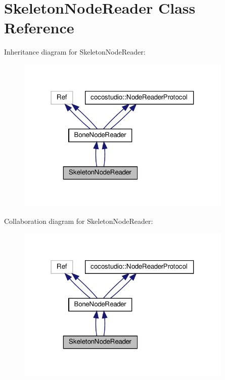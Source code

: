 \hypertarget{classSkeletonNodeReader}{}\section{Skeleton\+Node\+Reader Class Reference}
\label{classSkeletonNodeReader}


Inheritance diagram for Skeleton\+Node\+Reader\+:
\nopagebreak
\begin{figure}[H]
\begin{center}
\leavevmode
\includegraphics[width=292pt]{classSkeletonNodeReader__inherit__graph}
\end{center}
\end{figure}


Collaboration diagram for Skeleton\+Node\+Reader\+:
\nopagebreak
\begin{figure}[H]
\begin{center}
\leavevmode
\includegraphics[width=292pt]{classSkeletonNodeReader__coll__graph}
\end{center}
\end{figure}
